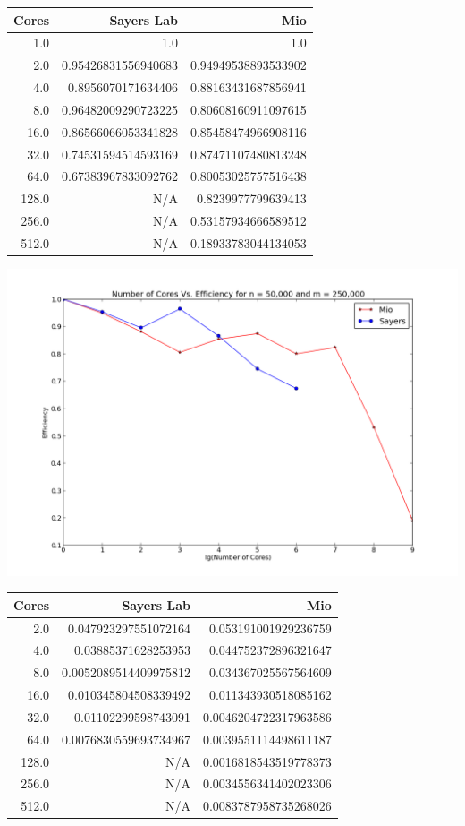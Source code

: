\documentclass[letterpaper, 12pt]{article}
\begin{document}
	\begin{tabular}{r|rr}
		Cores              &Sayers Lab                     &Mio \\ 
	\hline
		  1.0                     &1.0                     &1.0 \\ 
		  2.0     &0.95426831556940683     &0.94949538893533902 \\ 
		  4.0      &0.8956070171634406     &0.88163431687856941 \\ 
		  8.0     &0.96482009290723225     &0.80608160911097615 \\ 
		 16.0     &0.86566066053341828     &0.85458474966908116 \\ 
		 32.0     &0.74531594514593169     &0.87471107480813248 \\ 
		 64.0     &0.67383967833092762     &0.80053025757516438 \\ 
		128.0                     &N/A      &0.8239977799639413 \\ 
		256.0                     &N/A     &0.53157934666589512 \\ 
		512.0                     &N/A     &0.18933783044134053 \\ 
	\end{tabular}
	
	\includegraphics[width=.75\linewidth]{ProjectFiles/results/plots/coresVefficiency.png}
	
	\begin{tabular}{r|rr}
		Cores              &Sayers Lab                     &Mio \\ 
	\hline
		  2.0    &0.047923297551072164    &0.053191001929236759 \\ 
		  4.0     &0.03885371628253953    &0.044752372896321647 \\ 
		  8.0   &0.0052089514409975812    &0.034367025567564609 \\ 
		 16.0    &0.010345804508339492    &0.011343930518085162 \\ 
		 32.0     &0.01102299598743091   &0.0046204722317963586 \\ 
		 64.0   &0.0076830559693734967   &0.0039551114498611187 \\ 
		128.0                     &N/A   &0.0016818543519778373 \\ 
		256.0                     &N/A   &0.0034556341402023306 \\ 
		512.0                     &N/A   &0.0083787958735268026 \\ 
	\end{tabular}
	
\end{document}
